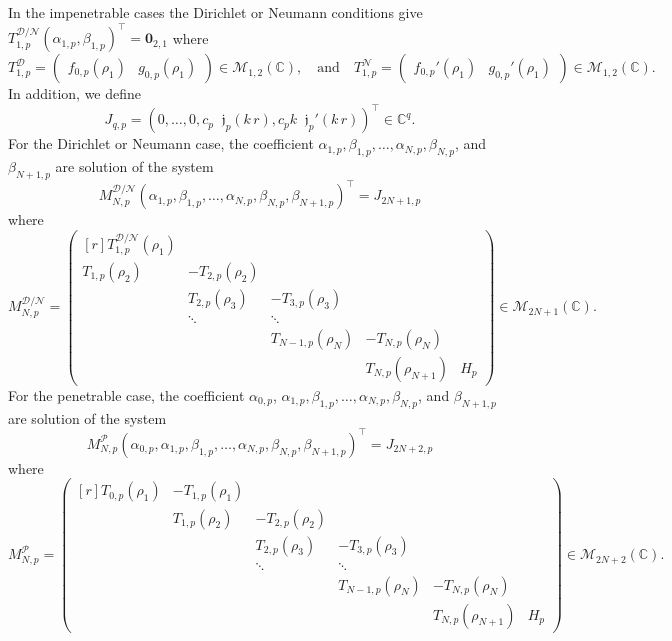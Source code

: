\documentclass[12pt,a4paper]{article}
\theoremstyle{definition}
\theoremstyle{plain}
\theoremstyle{remark}
\newcommand{\bbC}{\mathbb{C}}
\newcommand{\calD}{\mathcal{D}}
\newcommand{\calM}{\mathcal{M}}
\newcommand{\calN}{\mathcal{N}}
\newcommand{\calP}{\mathcal{P}}
\newcommand{\frj}{\mathop{}\!\mathfrak{j}}
\newcommand{\vect}[1]{\boldsymbol{#1}}
\begin{document}
In the impenetrable cases the Dirichlet or Neumann conditions give $T_{1, p}^{\calD/\calN} (\alpha_{1, p}, \beta_{1, p})^\intercal = \vect{0}_{2, 1}$ where
\[
    T_{1, p}^\calD = \begin{pmatrix}
        f_{0, p}(\rho_1) & g_{0, p}(\rho_1)
    \end{pmatrix} \in \calM_{1, 2}(\bbC), \quad
    \text{and} \quad
    T_{1, p}^\calN = \begin{pmatrix}
        f_{0, p}'(\rho_1) & g_{0, p}'(\rho_1)
    \end{pmatrix} \in \calM_{1, 2}(\bbC).
\]
In addition, we define
\[
    J_{q, p} = (0, \ldots, 0, c_p\frj_p(k\, r), c_p k \frj_p'(k\, r))^\intercal \in \bbC^{q}.
\]
For the Dirichlet or Neumann case, the coefficient $\alpha_{1, p}, \beta_{1, p}, \ldots, \alpha_{N, p}, \beta_{N, p}$, and $\beta_{N+1, p}$ are solution of the system
\[
    M_{N, p}^{\calD/\calN} (\alpha_{1, p}, \beta_{1, p}, \ldots, \alpha_{N, p}, \beta_{N, p}, \beta_{N+1, p})^\intercal = J_{2N+1, p}
\]
where
\[
    M_{N, p}^{\calD/\calN} = \begin{pmatrix*}[r]
        T_{1, p}^{\calD/\calN}(\rho_1)\\
        T_{1, p}(\rho_2) & -T_{2, p}(\rho_2)\\
        & T_{2, p}(\rho_3) & -T_{3, p}(\rho_3)\\
        & \ddots & \ddots\\
        & & T_{N-1, p}(\rho_N) & -T_{N, p}(\rho_N)\\
        & & & T_{N, p}(\rho_{N+1}) & H_p
    \end{pmatrix*} \in \calM_{2N+1}(\bbC).
\]
For the penetrable case, the coefficient $\alpha_{0, p}$, $\alpha_{1, p}, \beta_{1, p}, \ldots, \alpha_{N, p}, \beta_{N, p}$, and $\beta_{N+1, p}$ are solution of the system
\[
    M_{N, p}^\calP (\alpha_{0, p}, \alpha_{1, p}, \beta_{1, p}, \ldots, \alpha_{N, p}, \beta_{N, p}, \beta_{N+1, p})^\intercal = J_{2N+2, p}
\]
where
\[
    M_{N, p}^\calP = \begin{pmatrix*}[r]
        T_{0, p}(\rho_1) & -T_{1, p}(\rho_1)\\
        & T_{1, p}(\rho_2) & -T_{2, p}(\rho_2)\\
        & & T_{2, p}(\rho_3) & -T_{3, p}(\rho_3)\\
        & & \ddots & \ddots\\
        & & & T_{N-1, p}(\rho_N) & -T_{N, p}(\rho_N)\\
        & & & & T_{N, p}(\rho_{N+1}) & H_p
    \end{pmatrix*} \in \calM_{2N+2}(\bbC).
\]
\end{document}
